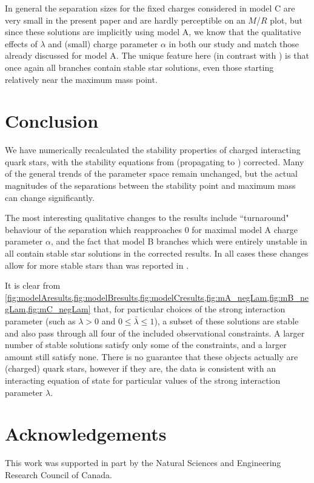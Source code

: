 \documentclass[12pt,noshowpacs,nofootinbib,notitlepage,amsmath,superscriptaddress]{revtex4-1}%
\begin{document}
In general the separation sizes for the fixed charges considered in model C are very small in the present paper and are hardly perceptible on an $M$/$R$ plot, but since these solutions are implicitly using model A, we know that the qualitative effects of $\lambda$ and (small) charge parameter $\alpha$ in both our study and \cite{zhang:2021} match those already discussed for model A. The unique feature here (in contrast with \cite{zhang:2021}) is that once again all branches contain stable star solutions, even those starting relatively near the maximum mass point.

\section{Conclusion}\label{sec:conclusion}

We have numerically recalculated the stability properties of charged interacting quark stars, with the stability equations from \cite{Goncalves:2020joq} (propagating to \cite{zhang:2021}) corrected. Many of the general trends of the parameter space remain unchanged, but the actual magnitudes of the separations between the stability point and maximum mass can change significantly.

The most interesting qualitative changes to the results include ``turnaround" behaviour of the separation which reapproaches 0 for maximal model A charge parameter $\alpha$, and the fact that model B branches which were entirely unstable in \cite{zhang:2021} all contain stable star solutions in the corrected results. In all cases these changes allow for more stable stars than was reported in \cite{zhang:2021}.

 It is clear from \cref{fig:modelAresults,fig:modelBresults,fig:modelCresults,fig:mA_negLam,fig:mB_negLam,fig:mC_negLam} that, for particular choices of the strong interaction parameter (such as $\lambda > 0$ and $0\leq \bar{\lambda} \leq 1$), a subset of these solutions are stable and also pass through all four of the included observational constraints. A larger number of stable solutions satisfy only some of the constraints, and a larger amount still satisfy none. There is no guarantee that these objects actually are (charged) quark stars, however if they are, the data is consistent with an interacting equation of state for particular values of the strong interaction parameter $\lambda$.
 


\section*{Acknowledgements}
This work was supported in part by the Natural Sciences and Engineering Research Council of Canada.
\end{document}
